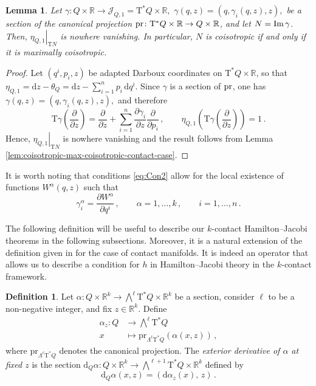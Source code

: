 \documentclass[11pt,twoside]{article}
\theoremstyle{plain}
\newtheorem{lemma}[theorem]{Lemma}
\theoremstyle{definition}
\newtheorem{definition}[theorem]{Definition}
\theoremstyle{remark}
\newcommand{\dd}{\mathrm{d}}
\renewcommand{\d}{\mathrm{d}}
\newcommand{\T}{\mathrm{T}}
\newcommand{\cT}{\mathrm{T}^\ast}
\newcommand\restr[2]{\left.#1\right|_{#2}} \newcommand{\bfX}{\mathbf{X}} \newcommand{\bfY}{\mathbf{Y}} \newcommand{\bfZ}{\mathbf{Z}} \newcommand{\qeddiamond}{\hfill $\diamond$} \newcommand{\parder}[2]{\frac{\partial #1}{\partial #2}} \newcommand{\dparder}[2]{\dfrac{\partial #1}{\partial #2}} \newcommand{\tparder}[2]{\partial #1/\partial #2} \newcommand{\parderr}[3]{\frac{\partial^2 #1}{\partial #2\partial #3}} \newcommand{\dparderr}[3]{\dfrac{\partial^2 #1}{\partial #2\partial #3}} \newcommand{\tparderr}[3]{\partial^2 #1/\partial #2\partial #3}
\begin{document}
\begin{lemma}\label{lem:k1-maximal-coisotropic}
Let \(
\gamma\colon Q\times \mathbb R \to \mathcal J_{Q,1}=\T^*Q\times \mathbb R,
\,\,
\gamma(q,z)=(q,\gamma_i(q,z),z),
\) be a section of the canonical projection \(
{\rm pr}\colon \T^*Q\times \mathbb R\to Q\times \mathbb R
\), and let $N={\rm Im}\,\gamma$. Then, $ \restr{\eta_{Q,1}}{\T N}$ is nowhere vanishing. In particular, $N$ is coisotropic if and only if it is maximally coisotropic.
\end{lemma}

\begin{proof}
Let $(q^i,p_i,z)$ be adapted Darboux coordinates on $\T^*Q\times \mathbb R$, so that $\eta_{Q,1}=\d z-\theta_Q=\d z-\sum_{i=1}^np_i\,\d q^i$. Since $\gamma$ is a section of ${\rm pr}$, one has
\(
\gamma(q,z)=(q,\gamma_i(q,z),z),
\) and therefore
\[
\T\gamma\!\left(\frac{\partial}{\partial z}\right)
=
\frac{\partial}{\partial z}
+
\sum_{i=1}^n
\frac{\partial \gamma_i}{\partial z}\frac{\partial}{\partial p_i}\,,\qquad \eta_{Q,1}\!\left(\T\gamma\!\left(\frac{\partial}{\partial z}\right)\right)=1\,.
\]
Hence, $\restr{\eta_{Q,1}}{\T N}$ is nowhere vanishing and the result follows from Lemma \ref{lem:coisotropic-max-coisotropic-contact-case}.
\end{proof}

It is worth noting that conditions \eqref{eq:Con2} allow for the local existence of functions $W^\alpha(q,z)$ such that
\[
\gamma_i^\alpha=\frac{\partial W^\alpha}{\partial q^i}\,,\qquad \alpha=1,\dotsc,k\,,\qquad i=1,\dotsc,n\,.
\]

The following definition will be useful to describe our $k$-contact Hamilton--Jacobi theorems in the following subsections. Moreover, it is a natural extension of the definition given in \cite{LLM_21a} for the case of contact manifolds. It is indeed an operator that allows us to describe a condition for $h$ in Hamilton--Jacobi theory in the $k$-contact framework.  
\begin{definition}
Let  \(
\alpha \colon Q \times \mathbb{R}^k \longrightarrow 
\bigwedge\nolimits^\ell \cT Q \times \mathbb{R}^k
\) be a section, consider $\ell$ to be a non-negative integer, and fix $z\in\mathbb{R}^k$. Define
\begin{align*}\textstyle
\alpha_z \colon Q &\longrightarrow \bigwedge\nolimits^\ell \cT Q \\
x & \longmapsto \mathrm{pr}_{\Lambda^\ell \cT Q}(\alpha(x,z))\,,
\end{align*}
where $\mathrm{pr}_{\Lambda^\ell \cT Q}$ denotes the canonical projection. The \emph{exterior derivative of $\alpha$ at fixed $z$} is the section \(
\dd_Q \alpha \colon Q \times \mathbb{R}^k \longrightarrow
\bigwedge\nolimits^{\ell+1}\cT Q \times \mathbb{R}^k
\) defined by
\[
\dd_Q \alpha(x,z) = (\dd \alpha_z(x),\, z)\,.
\]
\end{definition}
\end{document}
